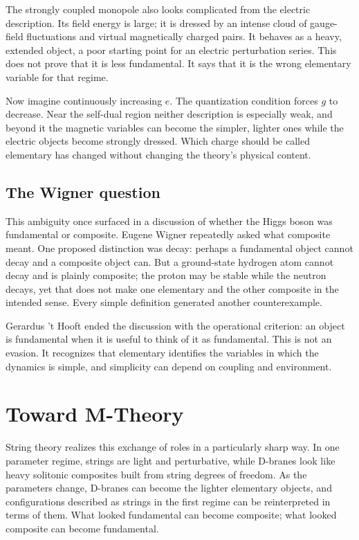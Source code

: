 The strongly coupled monopole also looks complicated from the electric
description. Its field energy is large; it is dressed by an intense cloud of
gauge-field fluctuations and virtual magnetically charged pairs. It behaves
as a heavy, extended object, a poor starting point for an electric
perturbation series. This does not prove that it is less fundamental. It says
that it is the wrong elementary variable for that regime.

Now imagine continuously increasing \(e\). The quantization condition forces
\(g\) to decrease. Near the self-dual region neither description is
especially weak, and beyond it the magnetic variables can become the simpler,
lighter ones while the electric objects become strongly dressed. Which
charge should be called elementary has changed without changing the theory's
physical content.

\subsection{The Wigner question}

This ambiguity once surfaced in a discussion of whether the Higgs boson was
fundamental or composite. Eugene Wigner repeatedly asked what composite
meant. One proposed distinction was decay: perhaps a fundamental object
cannot decay and a composite object can. But a ground-state hydrogen atom
cannot decay and is plainly composite; the proton may be stable while the
neutron decays, yet that does not make one elementary and the other composite
in the intended sense. Every simple definition generated another
counterexample.

Gerardus 't Hooft ended the discussion with the operational criterion: an
object is fundamental when it is useful to think of it as fundamental. This
is not an evasion. It recognizes that elementary identifies the variables in
which the dynamics is simple, and simplicity can depend on coupling and
environment.

\section{Toward M-Theory}

String theory realizes this exchange of roles in a particularly sharp way.
In one parameter regime, strings are light and perturbative, while D-branes
look like heavy solitonic composites built from string degrees of freedom. As
the parameters change, D-branes can become the lighter elementary objects,
and configurations described as strings in the first regime can be
reinterpreted in terms of them. What looked fundamental can become composite;
what looked composite can become fundamental.

